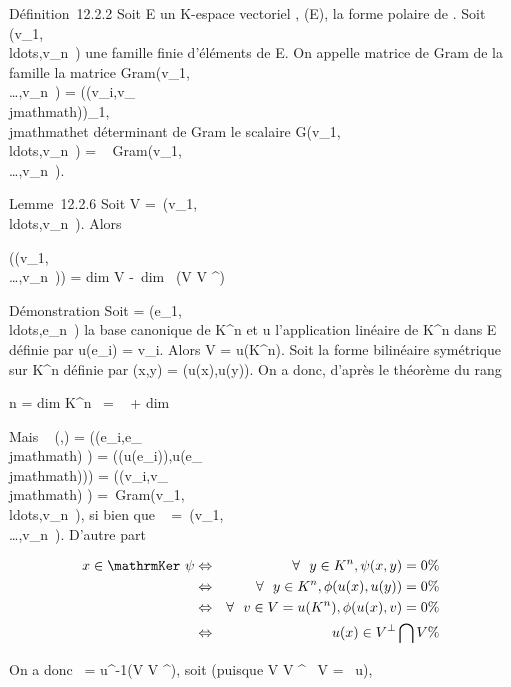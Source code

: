 \documentclass[]{article}
\begin{document}
Définition~12.2.2 Soit E un K-espace vectoriel , \Phi \inQ(E), \phi la forme
polaire de \Phi. Soit
(v_1,\\ldots,v_n~)
une famille finie d'éléments de E. On appelle matrice de Gram de la
famille la matrice
Gram(v_1,\\\ldots,v_n~)
= (\phi(v_i,v_\\jmathmath))_1\leqi,\\jmathmath\leqn et déterminant de Gram
le scalaire
G(v_1,\\ldots,v_n~)
= ~
Gram(v_1,\\\ldots,v_n~).

Lemme~12.2.6 Soit V =\
\mathrmVect(v_1,\\ldots,v_n~).
Alors

\mathrmrg(\Gram(v_1,\\\ldots,v_n~))
= dim V -\ dim~ (V \bigcap
V ^\bot)

Démonstration Soit  =
(e_1,\\ldots,e_n~)
la base canonique de K^n et u l'application linéaire de
K^n dans E définie par u(e_i) = v_i. Alors
V = u(K^n). Soit \psi la forme bilinéaire symétrique sur
K^n définie par \psi(x,y) = \phi(u(x),u(y)). On a donc, d'après le
théorème du rang

n = dim K^n~
= \mathrmrg~\psi
+ dim~
\mathrmKer~\psi

Mais \mathrmMat~ (\psi,) =
\left (\psi(e_i,e_\\jmathmath)\right
) = \left
(\phi(u(e_i)),u(e_\\jmathmath))\right ) =
\left (\phi(v_i,v_\\jmathmath)\right
) =\
Gram(v_1,\\ldots,v_n~),
si bien que \mathrmrg~\psi
=\
\mathrmrgGram(v_1,\\\ldots,v_n~).
D'autre part

\begin{align*} x
\in\mathrmKer~\psi&
\Leftrightarrow & \forall~~y \in
K^n, \psi(x,y) = 0 \%& \\ &
\Leftrightarrow & \forall~~y \in
K^n,\phi(u(x),u(y)) = 0 \%& \\ &
\Leftrightarrow & \forall~~v \in V =
u(K^n), \phi(u(x),v) = 0\%& \\ &
\Leftrightarrow & u(x) \in V ^\bot\bigcap V \%&
\\ \end{align*}

On a donc \mathrmKer~\psi =
u^-1(V \bigcap V ^\bot), soit (puisque V \bigcap V ^\bot\subset~
V = \mathrmIm~u),
\end{document}
